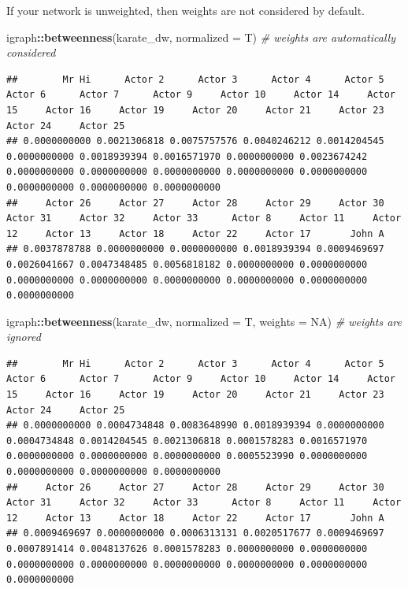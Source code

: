 \documentclass[
]{book}
\newenvironment{Shaded}{\begin{snugshade}}{\end{snugshade}}
\newcommand{\AttributeTok}[1]{\textcolor[rgb]{0.13,0.29,0.53}{#1}}
\newcommand{\CommentTok}[1]{\textcolor[rgb]{0.56,0.35,0.01}{\textit{#1}}}
\newcommand{\ConstantTok}[1]{\textcolor[rgb]{0.56,0.35,0.01}{#1}}
\newcommand{\FunctionTok}[1]{\textcolor[rgb]{0.13,0.29,0.53}{\textbf{#1}}}
\newcommand{\NormalTok}[1]{#1}
\newcommand{\SpecialCharTok}[1]{\textcolor[rgb]{0.81,0.36,0.00}{\textbf{#1}}}
\begin{document}
If your network is unweighted, then weights are not considered by default.

\begin{Shaded}
\begin{Highlighting}[]
\NormalTok{igraph}\SpecialCharTok{::}\FunctionTok{betweenness}\NormalTok{(karate\_dw, }\AttributeTok{normalized =}\NormalTok{ T) }\CommentTok{\# weights are automatically considered}
\end{Highlighting}
\end{Shaded}

\begin{verbatim}
##        Mr Hi      Actor 2      Actor 3      Actor 4      Actor 5      Actor 6      Actor 7      Actor 9     Actor 10     Actor 14     Actor 15     Actor 16     Actor 19     Actor 20     Actor 21     Actor 23     Actor 24     Actor 25 
## 0.0000000000 0.0021306818 0.0075757576 0.0040246212 0.0014204545 0.0000000000 0.0018939394 0.0016571970 0.0000000000 0.0023674242 0.0000000000 0.0000000000 0.0000000000 0.0000000000 0.0000000000 0.0000000000 0.0000000000 0.0000000000 
##     Actor 26     Actor 27     Actor 28     Actor 29     Actor 30     Actor 31     Actor 32     Actor 33      Actor 8     Actor 11     Actor 12     Actor 13     Actor 18     Actor 22     Actor 17       John A 
## 0.0037878788 0.0000000000 0.0000000000 0.0018939394 0.0009469697 0.0026041667 0.0047348485 0.0056818182 0.0000000000 0.0000000000 0.0000000000 0.0000000000 0.0000000000 0.0000000000 0.0000000000 0.0000000000
\end{verbatim}

\begin{Shaded}
\begin{Highlighting}[]
\NormalTok{igraph}\SpecialCharTok{::}\FunctionTok{betweenness}\NormalTok{(karate\_dw, }\AttributeTok{normalized =}\NormalTok{ T, }\AttributeTok{weights =} \ConstantTok{NA}\NormalTok{) }\CommentTok{\# weights are ignored}
\end{Highlighting}
\end{Shaded}

\begin{verbatim}
##        Mr Hi      Actor 2      Actor 3      Actor 4      Actor 5      Actor 6      Actor 7      Actor 9     Actor 10     Actor 14     Actor 15     Actor 16     Actor 19     Actor 20     Actor 21     Actor 23     Actor 24     Actor 25 
## 0.0000000000 0.0004734848 0.0083648990 0.0018939394 0.0000000000 0.0004734848 0.0014204545 0.0021306818 0.0001578283 0.0016571970 0.0000000000 0.0000000000 0.0000000000 0.0005523990 0.0000000000 0.0000000000 0.0000000000 0.0000000000 
##     Actor 26     Actor 27     Actor 28     Actor 29     Actor 30     Actor 31     Actor 32     Actor 33      Actor 8     Actor 11     Actor 12     Actor 13     Actor 18     Actor 22     Actor 17       John A 
## 0.0009469697 0.0000000000 0.0006313131 0.0020517677 0.0009469697 0.0007891414 0.0048137626 0.0001578283 0.0000000000 0.0000000000 0.0000000000 0.0000000000 0.0000000000 0.0000000000 0.0000000000 0.0000000000
\end{verbatim}
\end{document}
